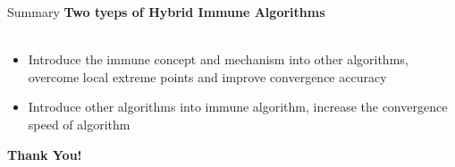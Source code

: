 \documentclass{beamer}
\begin{document}
\begin{frame}{Summary}
\textbf{Two tyeps of Hybrid Immune Algorithms} \\~\\
\begin{itemize}
\item{Introduce the immune concept and mechanism into other algorithms, overcome local extreme points and improve convergence accuracy}
\item{Introduce other algorithms into immune algorithm, increase the convergence speed of algorithm}
\end{itemize}
\end{frame}

\begin{frame}
\centering \Huge \textbf{Thank You!}
\end{frame}
\end{document}
